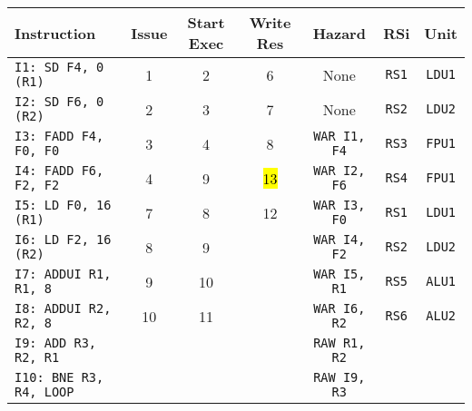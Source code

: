 \begin{enumerate}
    \begin{table}[!htp]
        \centering
        \begin{adjustbox}{width={\textwidth},totalheight={\textheight},keepaspectratio}
        \begin{tabular}{@{} l c c c c c c @{}}
            \toprule
            \textbf{Instruction} & \textbf{Issue} & \textbf{Start Exec} & \textbf{Write Res} & \textbf{Hazard} & \textbf{RSi} & \textbf{Unit} \\
            \midrule
            \texttt{I1: SD F4, 0 (R1)}      & 1 & 2 & 6 & None  & \texttt{RS1}   & \texttt{LDU1}  \\ [.5em]
            \texttt{I2: SD F6, 0 (R2)}      & 2 & 3 & 7 & None  & \texttt{RS2}   & \texttt{LDU2}  \\ [.5em]
            \texttt{I3: FADD F4, F0, F0}    & 3 & 4 & 8 & \texttt{WAR I1, F4}  & \texttt{RS3} & \texttt{FPU1} \\ [.5em]
            \texttt{I4: FADD F6, F2, F2}    & 4 & 9 & \hl{13} & \texttt{WAR I2, F6} & \texttt{RS4} & \texttt{FPU1} \\ [.5em]
            \texttt{I5: LD F0, 16 (R1)}     & 7 & 8 & 12 & \texttt{WAR I3, F0} & \texttt{RS1} & \texttt{LDU1} \\ [.5em]
            \texttt{I6: LD F2, 16 (R2)}     & 8 & 9 &   & \texttt{WAR I4, F2} & \texttt{RS2} & \texttt{LDU2} \\ [.5em]
            \texttt{I7: ADDUI R1, R1, 8}    & 9 & 10 &   & \texttt{WAR I5, R1} & \texttt{RS5} & \texttt{ALU1} \\ [.5em]
            \texttt{I8: ADDUI R2, R2, 8}    & 10 & 11 &   & \texttt{WAR I6, R2} & \texttt{RS6} & \texttt{ALU2} \\ [.5em]
            \texttt{I9: ADD R3, R2, R1}     &   &   &   & \texttt{RAW R1, R2} &       &       \\ [.5em]
            \texttt{I10: BNE R3, R4, LOOP}   &   &   &   & \texttt{RAW I9, R3} &       &       \\
            \bottomrule
        \end{tabular}
        \end{adjustbox}
    \end{table}
    

\end{enumerate}
